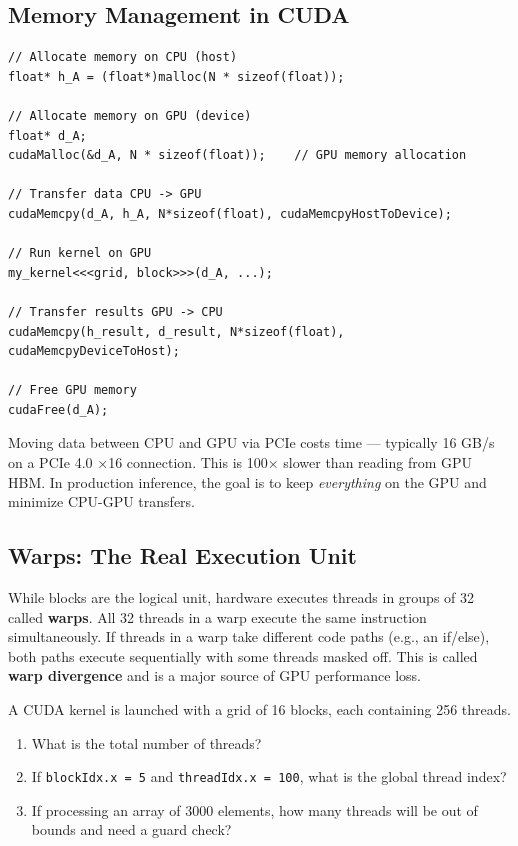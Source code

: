 \documentclass[10pt, oneside, openany]{book}
\newcommand{\notebox}[2]{\begin{tcolorbox}[notestyle, title={#1}]#2\end{tcolorbox}}
\newcounter{exercise}[chapter]
\newenvironment{exercise}[1][]
  {\refstepcounter{exercise}
   \begin{tcolorbox}[enhanced, breakable,
    colback={rgb,255:red,248;green,248;blue,248},
    colframe=DarkGray, boxrule=0.8pt, arc=3pt,
    title={\bfseries Exercise \thechapter.\theexercise\ifx&#1&\else: #1\fi},
    fonttitle=\bfseries\small,
    attach boxed title to top left={yshift=-2mm, xshift=5mm},
    boxed title style={colback=DarkGray, coltext=white, arc=2pt}]}
  {\end{tcolorbox}}
\newcommand{\keyterm}[1]{\textbf{\color{AccentOrange}#1}}
\begin{document}
\subsection{Memory Management in CUDA}

\begin{lstlisting}[style=cstyle, caption={CUDA memory allocation and transfer}]
// Allocate memory on CPU (host)
float* h_A = (float*)malloc(N * sizeof(float));

// Allocate memory on GPU (device)
float* d_A;
cudaMalloc(&d_A, N * sizeof(float));    // GPU memory allocation

// Transfer data CPU -> GPU
cudaMemcpy(d_A, h_A, N*sizeof(float), cudaMemcpyHostToDevice);

// Run kernel on GPU
my_kernel<<<grid, block>>>(d_A, ...);

// Transfer results GPU -> CPU
cudaMemcpy(h_result, d_result, N*sizeof(float), cudaMemcpyDeviceToHost);

// Free GPU memory
cudaFree(d_A);
\end{lstlisting}

\notebox{Memory Transfer is Expensive}{
Moving data between CPU and GPU via PCIe costs time --- typically 16 GB/s on a
PCIe 4.0 $\times$16 connection.  This is 100$\times$ slower than reading from GPU
HBM.  In production inference, the goal is to keep \emph{everything} on the GPU
and minimize CPU-GPU transfers.
}

\subsection{Warps: The Real Execution Unit}

While blocks are the logical unit, hardware executes threads in groups of 32
called \keyterm{warps}.  All 32 threads in a warp execute the same
instruction simultaneously.  If threads in a warp take different code paths
(e.g., an if/else), both paths execute sequentially with some threads masked off.
This is called \keyterm{warp divergence} and is a major
source of GPU performance loss.

\begin{exercise}[Thread Index Calculation]
A CUDA kernel is launched with a grid of 16 blocks, each containing 256 threads.
\begin{enumerate}
  \item What is the total number of threads?
  \item If \texttt{blockIdx.x = 5} and \texttt{threadIdx.x = 100},
        what is the global thread index?
  \item If processing an array of 3000 elements, how many threads will be out
        of bounds and need a guard check?
\end{enumerate}
\end{exercise}
\end{document}
